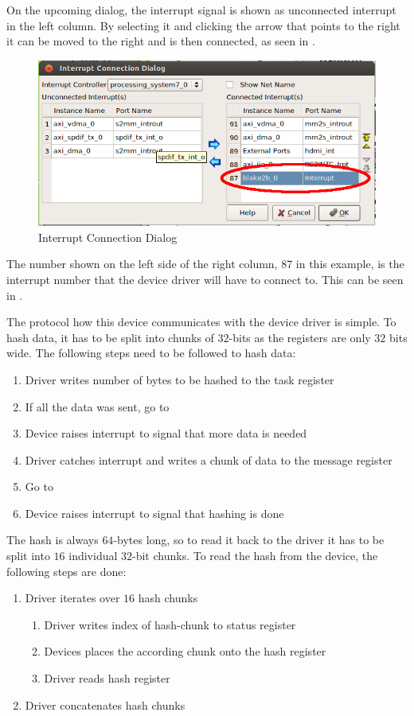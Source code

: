 On the upcoming dialog, the interrupt signal is shown as unconnected interrupt
in the left column.
By selecting it and clicking the arrow that points to the right it can be moved
to the right and is then connected, as seen in .

\begin{figure}[htbp]
\centering
\includegraphics[width=1\textwidth]{sections/methodology/gicconnect}
\caption{\label{fig:gicconnect} Interrupt Connection Dialog}
\end{figure}

The number shown on the left side of the right column, $87$ in this example, is
the interrupt number that the device driver will have to connect to.
This can be seen in .

The protocol how this device communicates with the device driver is simple.
To hash data, it has to be split into chunks of $32$-bits as the registers are
only $32$ bits wide.
The following steps need to be followed to hash data:
\begin{enumerate}
	\item Driver writes number of bytes to be hashed to the task register
	\item If all the data was sent, go to \label{item:check}
	\item Device raises interrupt to signal that more data is needed
	\item Driver catches interrupt and writes a chunk of data to the message
		register
	\item Go to 
	\item Device raises interrupt to signal that hashing is done\label{item:end}
\end{enumerate}
The hash is always $64$-bytes long, so to read it back to the driver it has to
be split into $16$ individual $32$-bit chunks.
To read the hash from the device, the following steps are done:
\begin{enumerate}
	\item Driver iterates over $16$ hash chunks
		\begin{enumerate}
			\item Driver writes index of hash-chunk to status register
			\item Devices places the according chunk onto the hash register
			\item Driver reads hash register
		\end{enumerate}
	\item Driver concatenates hash chunks
\end{enumerate}
